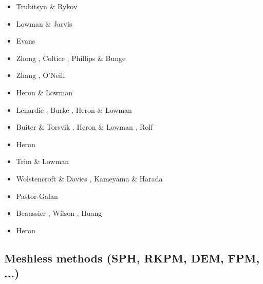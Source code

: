 \begin{scriptsize}
\begin{itemize}
\item[\nineteenninetyfive] Trubitsyn \& Rykov \cite{trry95}
\item[\nineteenninetynine] Lowman \& Jarvis \cite{loja99}
\item[\twothousandthree] Evans \cite{evan03}
\item[\twothousandseven] Zhong \etal \cite{zhzl07}, Coltice \etal \cite{copb07}, 
                         Phillips \& Bunge \cite{phbu07}
\item[\twothousandnine] Zhang \etal \cite{zhzm09}, O'Neill \etal \cite{onlj09}
\item[\twothousandten] Heron \& Lowman \cite{helo10}
\item[\twothousandeleven] Lenardic \etal \cite{lemj11}, Burke \cite{burk11}, Heron \& Lowman \cite{helo11}
\item[\twothousandfourteen] Buiter \& Torsvik \cite{buto14}, Heron \& Lowman \cite{helo14}, 
                            Rolf \etal \cite{roct14}
\item[\twothousandfifteen] Heron \etal \cite{hels15}
\item[\twothousandsixteen] Trim \& Lowman \cite{trlo16}
\item[\twothousandseventeen] Wolstencroft \& Davies \cite{woda17}, Kameyama \& Harada \cite{kaha17}
\item[\twothousandeighteen] Pastor-Galan \etal \cite{panm18}
\item[\twothousandnineteen] Beaussier \etal \cite{begb19}, Wilson \etal \cite{wihb19}, 
                            Huang \etal \cite{huzl19} 
\item[\twothousandtwenty] Heron \etal \cite{hemn20}
\end{itemize}
\end{scriptsize}

\subsection{Meshless methods (SPH, RKPM, DEM, FPM, ...)}

